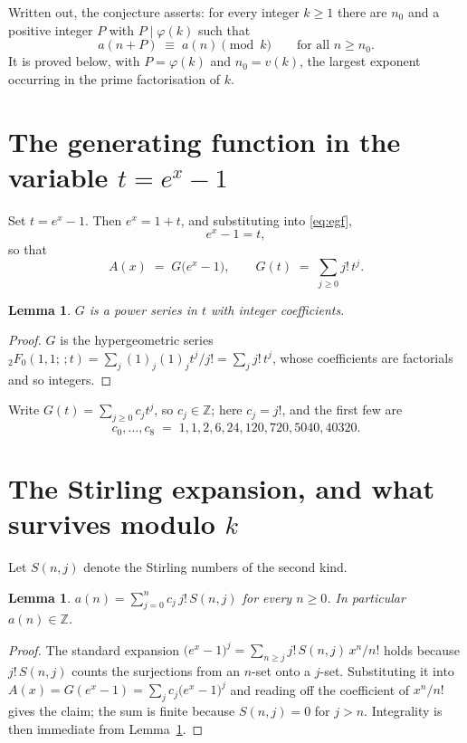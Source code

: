 \documentclass[11pt,a4paper]{article}
\theoremstyle{plain}
\newtheorem{lemma}[theorem]{Lemma}
\theoremstyle{definition}
\begin{document}
Written out, the conjecture asserts: for every integer $k\ge 1$ there are $n_0$ and a
positive integer $P$ with $P\mid\varphi(k)$ such that
\begin{equation}\label{eq:conj}
a(n+P)\;\equiv\;a(n)\pmod{k}\qquad\text{for all } n\ge n_0 .
\end{equation}
It is proved below, with $P=\varphi(k)$ and $n_0=v(k)$, the largest exponent occurring in
the prime factorisation of $k$.

\section{The generating function in the variable $t=e^{x}-1$}

Set $t=e^{x}-1$. Then $e^{x}=1+t$, and substituting into \eqref{eq:egf},
\[
e^{x}-1=t,
\]
so that
\begin{equation}\label{eq:G}
A(x)\;=\;G\bigl(e^{x}-1\bigr),\qquad
G(t)\;=\;\sum_{j\ge 0} j!\,t^{j}.
\end{equation}

\begin{lemma}\label{lem:int}
$G$ is a power series in $t$ with integer coefficients.
\end{lemma}

\begin{proof}
$G$ is the hypergeometric series ${}_{2}F_{0}(1,1;\,;t)=\sum_j (1)_j (1)_j t^{j}/j! =\sum_j j!\,t^{j}$, whose coefficients are factorials and so integers.
\end{proof}

Write $G(t)=\sum_{j\ge0}c_j t^{j}$, so $c_j\in\mathbb{Z}$; here $c_j=j!$, and the
first few are
\[
c_0,\dots,c_8 \;=\; 1, 1, 2, 6, 24, 120, 720, 5040, 40320.
\]

\section{The Stirling expansion, and what survives modulo $k$}

Let $S(n,j)$ denote the Stirling numbers of the second kind.

\begin{lemma}\label{lem:stir}
$a(n)=\sum_{j=0}^{n} c_j\, j!\, S(n,j)$ for every $n\ge 0$. In particular $a(n)\in\mathbb{Z}$.
\end{lemma}

\begin{proof}
The standard expansion $\bigl(e^{x}-1\bigr)^{j}
=\sum_{n\ge j} j!\,S(n,j)\,x^{n}/n!$ holds because $j!\,S(n,j)$ counts the surjections
from an $n$-set onto a $j$-set. Substituting it into
$A(x)=G(e^{x}-1)=\sum_j c_j\bigl(e^{x}-1\bigr)^{j}$ and reading off the coefficient of
$x^{n}/n!$ gives the claim; the sum is finite because $S(n,j)=0$ for $j>n$. Integrality is
then immediate from Lemma~\ref{lem:int}.
\end{proof}
\end{document}
